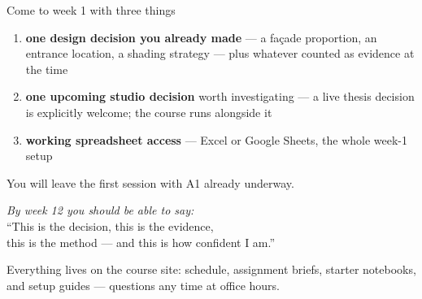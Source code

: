 \documentclass[aspectratio=169,10pt]{beamer}
\newcommand{\muted}[1]{{\color{cMute}#1}}
\begin{document}
\begin{frame}{Come to week 1 with three things}
  \begin{enumerate}
    \item \textbf{one design decision you already made} --- a façade
          proportion, an entrance location, a shading strategy --- plus
          whatever counted as evidence at the time
    \item \textbf{one upcoming studio decision} worth investigating --- a
          live thesis decision is explicitly welcome; the course runs
          alongside it
    \item \textbf{working spreadsheet access} --- Excel or Google Sheets,
          the whole week-1 setup
  \end{enumerate}
  \vspace{2mm}
  You will leave the first session with A1 already underway.
  \vspace{1mm}
  \begin{center}
    {\large\itshape By week 12 you should be able to say:}\\[2mm]
    {\large ``This is the decision, this is the evidence,\\
    this is the method --- and this is how confident I am.''}
  \end{center}
  \vfill
  Everything lives on the course site: schedule, assignment briefs, starter
  notebooks, and setup guides --- \muted{questions any time at office hours.}
\end{frame}
\end{document}
